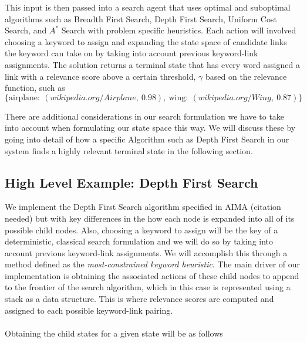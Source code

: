 \documentclass[twoside,11pt]{article}
\begin{document}
This input is then passed into a search agent that uses optimal and suboptimal algorithms such as Breadth First Search, Depth First Search, Uniform Cost Search, and $A^*$ Search with problem specific heuristics. Each action will involved choosing a keyword to assign and expanding the state space of candidate links the keyword can take on by taking into account previous keyword-link assignments. The solution returns a terminal state that has every word assigned a link with a relevance score above a certain threshold, $\gamma$ based on the relevance function, such as
$$\{\mbox{airplane}: \ (wikipedia.org/Airplane, \ 0.98), \  \mbox{wing}: \ (wikipedia.org/Wing, \ 0.87)\}$$

There are additional considerations in our search formulation we have to take into account when formulating our state space this way. We will discuss these by going into detail of how a specific Algorithm such as Depth First Search in our system finds a highly relevant terminal state in the following section.

\subsection{High Level Example: Depth First Search}

We implement the Depth First Search algorithm specified in AIMA (citation needed) but with key differences in the how each node is expanded into all of its possible child nodes. Also, choosing a keyword to assign will be the key of a deterministic, classical search formulation and we will do so by taking into account previous keyword-link assignments. We will accomplish this through a method defined as the \textit{most-constrained keyword heuristic}. The main driver of our implementation is obtaining the associated actions of these child nodes to append to the frontier of the search algorithm, which in this case is represented using a stack as a data structure. This is where relevance scores are computed and assigned to each possible keyword-link pairing.
\\ \\
Obtaining the child states for a given state will be as follows
\end{document}

